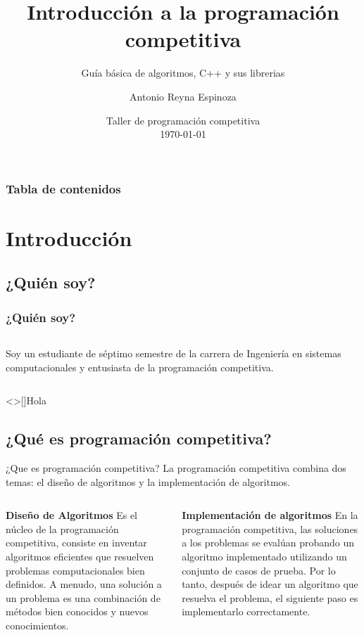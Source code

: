 \documentclass[10pt]{beamer}
\title{Introducción a la programación competitiva}%
\subtitle{Gu\'ia b\'asica de algoritmos, C++ y sus librerias}%
\author{Antonio Reyna Espinoza}%
\institute[ITSM]{Instituto Tecnol\'ogico Superior de El Mante}
\date[\textcolor{white}{\today}]
{Taller de programación competitiva \\
\today}
\begin{document}
\frame{\titlepage}
\begin{frame}
  \frametitle{Tabla de contenidos}
  \tableofcontents
\end{frame}



\section{Introducción}

\subsection*{¿Qui\'en soy?}
\begin{frame}
  \frametitle{¿Qui\'en soy?}
  \begin{columns}
    Soy un estudiante de séptimo semestre de la carrera de Ingeniería en sistemas computacionales y entusiasta de la programación competitiva.
  \end{columns}
\end{frame}

\note<>[]{Hola}
\subsection*{¿Qu\'e es programación competitiva?}
\begin{frame}{¿Que es programación competitiva?}
  La programación competitiva combina dos temas: el dise\~no de algoritmos y la implementaci\'on de algoritmos.

  \vfill

  \begin{columns}
    \textbf{Diseño de Algoritmos} Es el núcleo de la programación competitiva, consiste en inventar algoritmos eficientes que resuelven problemas computacionales bien definidos. A menudo, una solución a un problema es una combinación de métodos bien conocidos y nuevos conocimientos.

    \textbf{Implementación de algoritmos} En la programación competitiva, las soluciones a los problemas se evalúan probando un algoritmo implementado utilizando un conjunto de casos de prueba. Por lo tanto, después de idear un algoritmo que resuelva el problema, el siguiente paso es implementarlo correctamente.
  \end{columns}
\end{frame}
\end{document}
